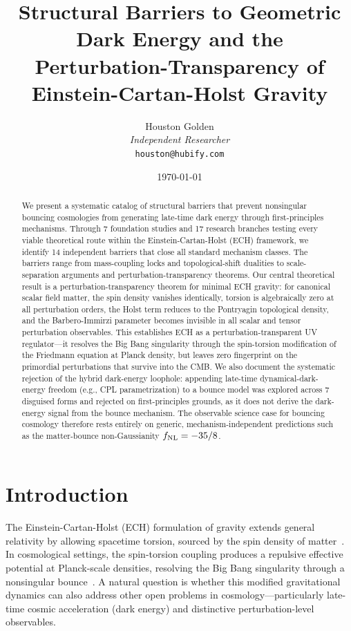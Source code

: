 \documentclass[a4paper,11pt]{article}
\title{Structural Barriers to Geometric Dark Energy and the\\Perturbation-Transparency of Einstein-Cartan-Holst Gravity}
\author{Houston Golden\\[4pt]
{\small\textit{Independent Researcher}}\\[2pt]
{\small\texttt{houston@hubify.com}}}
\date{\today}
\newcommand{\fnl}{f_{\rm NL}}
\begin{document}
\sloppy
\maketitle

\begin{abstract}
We present a systematic catalog of structural barriers that prevent nonsingular bouncing cosmologies from generating late-time dark energy through first-principles mechanisms. Through 7 foundation studies and 17 research branches testing every viable theoretical route within the Einstein-Cartan-Holst (ECH) framework, we identify 14 independent barriers that close all standard mechanism classes. The barriers range from mass-coupling locks and topological-shift dualities to scale-separation arguments and perturbation-transparency theorems. Our central theoretical result is a perturbation-transparency theorem for minimal ECH gravity: for canonical scalar field matter, the spin density vanishes identically, torsion is algebraically zero at all perturbation orders, the Holst term reduces to the Pontryagin topological density, and the Barbero-Immirzi parameter becomes invisible in all scalar and tensor perturbation observables. This establishes ECH as a perturbation-transparent UV regulator---it resolves the Big Bang singularity through the spin-torsion modification of the Friedmann equation at Planck density, but leaves zero fingerprint on the primordial perturbations that survive into the CMB. We also document the systematic rejection of the hybrid dark-energy loophole: appending late-time dynamical-dark-energy freedom (e.g., CPL parametrization) to a bounce model was explored across 7 disguised forms and rejected on first-principles grounds, as it does not derive the dark-energy signal from the bounce mechanism. The observable science case for bouncing cosmology therefore rests entirely on generic, mechanism-independent predictions such as the matter-bounce non-Gaussianity $\fnl = -35/8$.
\end{abstract}

\section{Introduction}

The Einstein-Cartan-Holst (ECH) formulation of gravity extends general relativity by allowing spacetime torsion, sourced by the spin density of matter~\citep{Holst:1995pc}. In cosmological settings, the spin-torsion coupling produces a repulsive effective potential at Planck-scale densities, resolving the Big Bang singularity through a nonsingular bounce~\citep{Alexander:2014eva}. A natural question is whether this modified gravitational dynamics can also address other open problems in cosmology---particularly late-time cosmic acceleration (dark energy) and distinctive perturbation-level observables.
\end{document}
